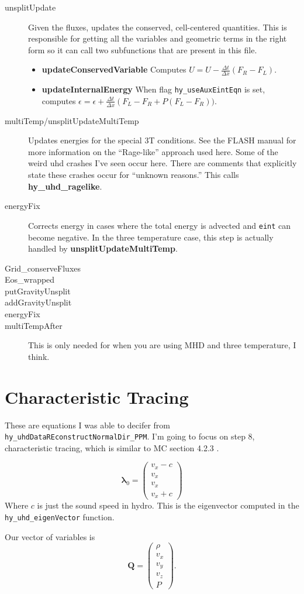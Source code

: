 \documentclass[preprint,11pt]{aastex}
\newcommand{\beq}{\begin{equation}}
\newcommand{\eeq}{\end{equation}}
\begin{document}
\begin{description}
\begin{description}
		\item[unsplitUpdate] Given the fluxes, updates the conserved, cell-centered quantities.  This is responsible for getting all the variables and geometric terms in the right form so it can call two subfunctions that are present in this file.
		\begin{itemize}
			\item \textbf{updateConservedVariable} Computes $U = U-\frac{\Delta t}{\Delta x}\left( F_R - F_L \right)$.
			\item \textbf{updateInternalEnergy} When flag \verb!hy_useAuxEintEqn! is set, computes $\epsilon = \epsilon + \frac{\Delta t}{\Delta x} \left( F_L - F_R + P (F_L - F_R))$.
		\end{itemize}
		\item[multiTemp/unsplitUpdateMultiTemp] Updates energies for the special 3T conditions.  See the FLASH manual for more information on the "`Rage-like"' approach used here.  Some of the weird uhd crashes I've seen occur here.  There are comments that explicitly state these crashes occur for "`unknown reasons."'  This calls \textbf{hy\_uhd\_ragelike}.
		
		\item[energyFix] Corrects energy in cases where the total energy is advected and \verb!eint! can become negative.  In the three temperature case, this step is actually handled by \textbf{unsplitUpdateMultiTemp}.
		\item[Grid\_conserveFluxes]
		\item[Eos\_wrapped]
		\item[putGravityUnsplit]
		\item[addGravityUnsplit]
		\item[energyFix]
		\item[multiTempAfter] This is only needed for when you are using MHD and three temperature, I think.

	
	\end{description}
	\end{description}

\section{Characteristic Tracing}
\label{sec:characteristic}
These are equations I was able to decifer from \verb!hy_uhdDataREconstructNormalDir_PPM!.  I'm going to focus on step $8$, characteristic tracing, which is similar to MC section 4.2.3 .

\beq
\mathbf{\lambda}_0 = \begin{pmatrix}v_x - c\\v_x \\ v_x \\ v_x + c\end{pmatrix}
\eeq
Where $c$ is just the sound speed in hydro.  This is the eigenvector computed in the \verb!hy_uhd_eigenVector! function.

Our vector of variables is
\beq
\mathbf{Q} = \begin{pmatrix}\rho\\v_x \\ v_y \\ v_z \\ P
\end{pmatrix}.
\eeq
\end{document}
